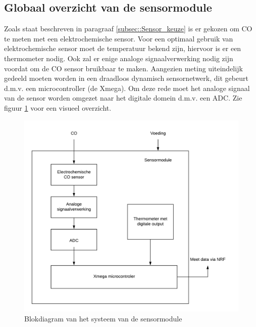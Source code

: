 \documentclass[a4paper, 11pt]{article} %
\begin{document}
	\subsection{Globaal overzicht van de sensormodule}
	\label{subsec::Globaal_Overzicht}
	Zoals staat beschreven in paragraaf \ref{subsec::Sensor_keuze} is er gekozen om CO te meten met een elektrochemische sensor. Voor een optimaal gebruik van elektrochemische sensor moet de temperatuur bekend zijn, hiervoor is er een thermometer nodig. Ook zal er enige analoge signaalverwerking nodig zijn voordat om de CO sensor bruikbaar te maken. Aangezien meting uiteindelijk gedeeld moeten worden in een draadloos dynamisch sensornetwerk, dit gebeurt d.m.v. een microcontroller (de Xmega). Om deze rede moet het analoge signaal van de sensor worden omgezet naar het digitale domein d.m.v. een ADC. Zie figuur \ref{fig:Dia_sensormodule} voor een visueel overzicht.
	\newpage
	\begin{figure}[h!]
		\centering
		\includegraphics[width=1.1\linewidth]{afbeeldingen/Dia_Sensormodule.png}
		\caption{Blokdiagram van het systeem van de sensormodule}
		\label{fig:Dia_sensormodule}
	\end{figure}
\end{document}
